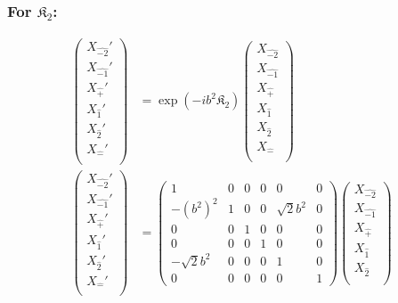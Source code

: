 \documentclass[]{article}
\numberwithin{equation}{section}
\begin{document}
{{\subsubsection{For $\mathfrak{K}_{2}$:}
\begin{align}
\begin{pmatrix}
    {X}_{\hat{-2}}'\\
    {X}_{\hat{-1}}'\\
    {X}_{\hat{+}}'\\
    {X}_{\hat{1}}'\\
    {X}_{\hat{2}}'\\
    {X}_{\hat{-}}'\\
    \end{pmatrix}&= \exp{(-ib^{2} \mathfrak{K}_{2})}\begin{pmatrix}
    {X}_{\hat{-2}}\\
    {X}_{\hat{-1}}\\
    {X}_{\hat{+}}\\
    {X}_{\hat{1}}\\
    {X}_{\hat{2}}\\
    {X}_{\hat{-}}\\
    \end{pmatrix}\\
    \begin{pmatrix}
    {X}_{\hat{-2}}'\\
    {X}_{\hat{-1}}'\\
    {X}_{\hat{+}}'\\
    {X}_{\hat{1}}'\\
    {X}_{\hat{2}}'\\
    {X}_{\hat{-}}'\\
    \end{pmatrix}&= \begin{pmatrix}
        1&0&0&0&0&0\\
        -(b^{2})^{2}&1&0&0&\sqrt{2}b^{2}&0\\
        0&0&1&0&0&0\\
        0&0&0&1&0&0\\
        -\sqrt{2}b^{2}&0&0&0&1&0\\
        0&0&0&0&0&1
    \end{pmatrix}\begin{pmatrix}
    {X}_{\hat{-2}}\\
    {X}_{\hat{-1}}\\
    {X}_{\hat{+}}\\
    {X}_{\hat{1}}\\
    {X}_{\hat{2}}\\

\end{pmatrix}
\end{align}}}
\end{document}
